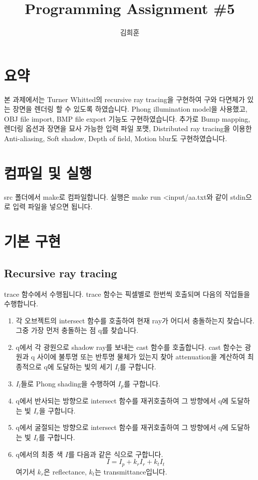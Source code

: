 \documentclass{article}
\begin{document}
\title{Programming Assignment \#5}
\author{김희훈}
\maketitle

\section{요약}

본 과제에서는 Turner Whitted의 recursive ray tracing을 구현하여 구와 다면체가 있는 장면을 렌더링 할 수 있도록 하였습니다.
Phong illumination model을 사용했고, OBJ file import, BMP file export 기능도 구현하였습니다.
추가로 Bump mapping, 렌더링 옵션과 장면을 묘사 가능한 입력 파일 포맷, Distributed ray tracing을 이용한 Anti-aliasing, Soft shadow, Depth of field, Motion blur도 구현하였습니다.

\section{컴파일 및 실행}

src 폴더에서 make로 컴파일합니다.
실행은 make run \textless input/aa.txt와 같이 stdin으로 입력 파일을 넣으면 됩니다.

\section{기본 구현}

\subsection{Recursive ray tracing}

trace 함수에서 수행됩니다.
trace 함수는 픽셀별로 한번씩 호출되며 다음의 작업들을 수행합니다.

\begin{enumerate}
  \item
    각 오브젝트의 intersect 함수를 호출하여 현재 ray가 어디서 충돌하는지 찾습니다.
    그중 가장 먼저 충돌하는 점 q를 찾습니다.
  \item
    q에서 각 광원으로 shadow ray를 보내는 cast 함수를 호출합니다.
    cast 함수는 광원과 q 사이에 불투명 또는 반투명 물체가 있는지 찾아 attenuation을 계산하여 최종적으로 q에 도달하는 빛의 세기 $I_l$를 구합니다.
  \item
    $I_l$들로 Phong shading을 수행하여 $I_p$를 구합니다.
  \item
    q에서 반사되는 방향으로 intersect 함수를 재귀호출하여 그 방향에서 q에 도달하는 빛 $I_r$을 구합니다.
  \item
    q에서 굴절되는 방향으로 intersect 함수를 재귀호출하여 그 방향에서 q에 도달하는 빛 $I_t$를 구합니다.
  \item
    q에서의 최종 색 $I$를 다음과 같은 식으로 구합니다.
    \begin{equation*}
      I=I_p+k_r I_r+k_t I_t
    \end{equation*}
    여기서 $k_r$은 reflectance, $k_t$는 transmittance입니다.
\end{enumerate}
\end{document}
